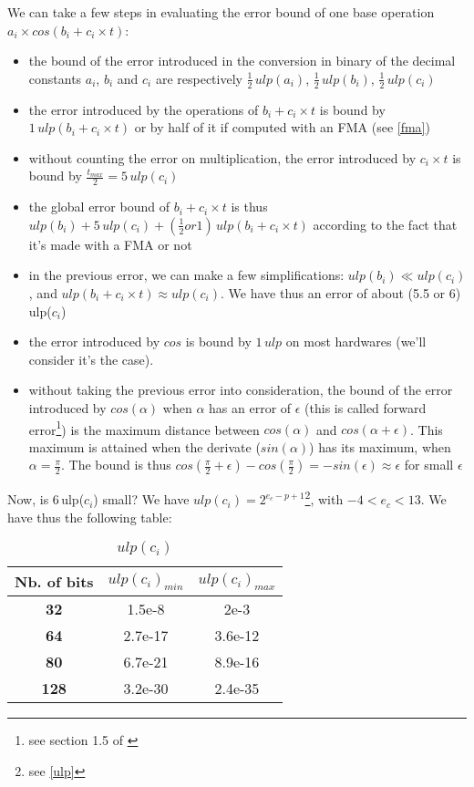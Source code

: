 We can take a few steps in evaluating the error bound of one base operation $a_i\times cos(b_i + c_i \times t)$:
\begin{itemize}
\item the bound of the error introduced in the conversion in binary of the decimal constants $a_i$, $b_i$ and $c_i$ are respectively $\frac{1}{2}\,ulp(a_i)$, $\frac{1}{2}\,ulp(b_i)$, $\frac{1}{2}\,ulp(c_i)$
\item the error introduced by the operations of $b_i + c_i \times t$ is bound by $1\,ulp(b_i+c_i\times t)$ or by half of it if computed with an FMA (see \ref{fma})
\item without counting the error on multiplication, the error introduced by $c_i \times t$ is bound by $\frac{t_{max}}{2}=5\,ulp(c_i)$
\item the global error bound of $b_i + c_i \times t$ is thus $ulp(b_i) + 5\,ulp(c_i) + (\frac{1}{2} or 1)\,ulp(b_i+c_i\times t)$ according to the fact that it's made with a FMA or not
\item in the previous error, we can make a few simplifications: $ulp(b_i) \ll ulp(c_i)$, and $ulp(b_i+c_i\times t)\approx ulp(c_i)$. We have thus an error of about (5.5 or 6)\,ulp($c_i$)
\item the error introduced by $cos$ is bound by $1\,ulp$ on most hardwares (we'll consider it's the case).
\item without taking the previous error into consideration, the bound of the error introduced by $cos(\alpha)$ when $\alpha$ has an error of $\epsilon$ (this is called forward error\footnote{see section 1.5 of \cite{Higham}}) is the maximum distance between $cos(\alpha)$ and $cos(\alpha + \epsilon)$. This maximum is attained when the derivate ($sin(\alpha)$) has its maximum, when $\alpha = \frac{\pi}{2}$. The bound is thus $cos(\frac{\pi}{2}+\epsilon)-cos(\frac{\pi}{2}) = -sin(\epsilon) \approx \epsilon$ for small $\epsilon$
\end{itemize}

Now, is 6\,ulp($c_i$) small? We have $ulp(c_i)=2^{e_c-p+1}$\footnote{see \ref{ulp}}, with $-4<e_c<13$. We have thus the following table:

\begin{table}[h]
\centering
{}
\begin{tabular}{|c|S|S|}
\hline
\textbf{Nb. of bits} &  & \\\hline
\textbf{32} & 1.5e-8 & 2e-3 \\\hline %
\textbf{64} & 2.7e-17 & 3.6e-12\\\hline %
\textbf{80} & 6.7e-21 & 8.9e-16\\\hline %
\textbf{128} & 3.2e-30 & 2.4e-35\\\hline %
\end{tabular}
\caption{$ulp(c_i)$}
\end{table}

